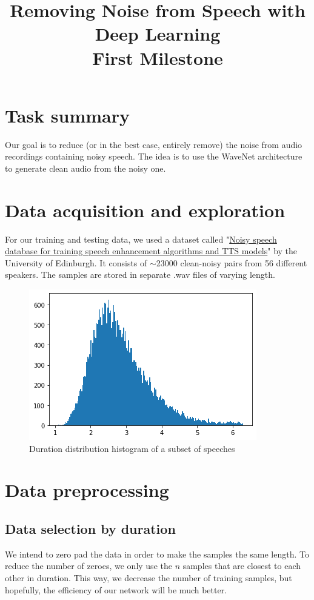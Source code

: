 \documentclass[12pt]{article}
\title{Removing Noise from Speech with Deep Learning\\
	\Large{First Milestone}}
\author{}
\date{}
\begin{document}
	
	\maketitle
	\section{Task summary}
	Our goal is to reduce (or in the best case, entirely remove) the noise from audio recordings containing noisy speech. The idea is to use the WaveNet\cite{wavenet}\cite{rethage2018wavenet} architecture to generate clean audio from the noisy one.
	
	
	\section{Data acquisition and exploration}
	For our training and testing data, we used a dataset called "\href{https://datashare.is.ed.ac.uk/handle/10283/2791}{Noisy speech database for training speech enhancement algorithms and TTS models}"\cite{dataset} by the University of Edinburgh. It consists of $\sim$23000 clean-noisy pairs from 56 different speakers. 
	The samples are stored in separate .wav files of varying length.  
	
	\begin{figure}[H]
		\centering
		\includegraphics[width=.5\linewidth]{durations}
		\caption{Duration distribution histogram of a subset of speeches}
	\end{figure}
	
	
	
	\section{Data preprocessing}
	\subsection{Data selection by duration} \label{sel_dur}
	We intend to zero pad the data in order to make the samples the same length. To reduce the number of zeroes, we only use the $n$ samples that are closest to each other in duration. This way, we decrease the number of training samples, but hopefully, the efficiency of our network will be much better.
	
\end{document}
